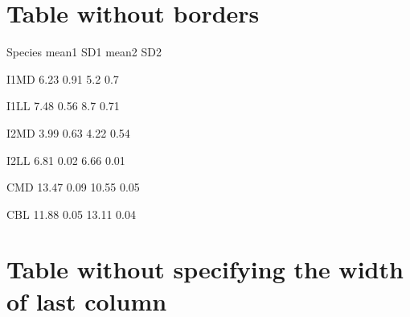 \documentclass{article}
\begin{document}
\section{Table without borders}



Species    mean1      SD1       mean2      SD2  

I1MD      6.23      0.91      5.2       0.7  

I1LL      7.48      0.56      8.7       0.71 

I2MD      3.99      0.63      4.22      0.54 

I2LL      6.81      0.02      6.66      0.01 

CMD      13.47      0.09      10.55      0.05 

CBL      11.88      0.05      13.11      0.04 


\section{Table without specifying the width of last column}

\end{document}
